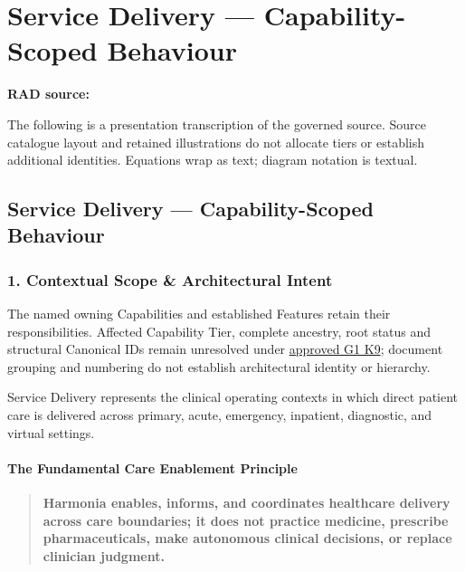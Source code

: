 \chapter{Service Delivery — Capability-Scoped Behaviour}\label{rad:sd}
\noindent\textbf{RAD source:} \texttt{}

The following is a presentation transcription of the governed source. Source catalogue layout and retained illustrations do not allocate tiers or establish additional identities. Equations wrap as text; diagram notation is textual.

\label{rad:sd:1}
\section*{Service Delivery — Capability-Scoped Behaviour}
\label{rad:sd:3}
\subsection*{1. Contextual Scope \& Architectural Intent}
\label{rad:sd:5}

The named owning Capabilities and established Features retain their responsibilities. Affected Capability Tier, complete ancestry, root status and structural Canonical IDs remain unresolved under \hyperref[rad:k9:1392]{approved G1 K9}; document grouping and numbering do not establish architectural identity or hierarchy.

\label{rad:sd:7}

Service Delivery represents the clinical operating contexts in which direct patient care is delivered across primary, acute, emergency, inpatient, diagnostic, and virtual settings.

\label{rad:sd:9}
\subsubsection*{The Fundamental Care Enablement Principle}
\label{rad:sd:10}

\begin{quote}

\textbf{Harmonia enables, informs, and coordinates healthcare delivery across care boundaries; it does not practice medicine, prescribe pharmaceuticals, make autonomous clinical decisions, or replace clinician judgment.}


\end{quote}
\label{rad:sd:12}

